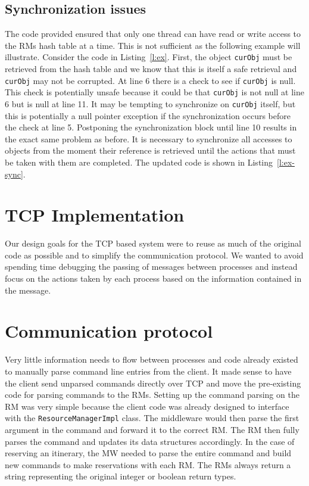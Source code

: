 \documentclass{article}
\newcommand{\includecode}[3]{}
\begin{document}
\subsection{Synchronization issues}

The code provided ensured that only one thread can have read or write access to the RMs hash table at a time. 
This is not sufficient as the following example will illustrate. 
Consider the code in Listing~\ref{l:ex}. 
First, the object \texttt{curObj} must be retrieved from the hash table and we know that this is itself a safe retrieval and \texttt{curObj} may not be corrupted. 
At line 6 there is a check to see if \texttt{curObj} is null. 
This check is potentially unsafe because it could be that \texttt{curObj} is not null at line 6 but is null at line 11. 
It may be tempting to synchronize on \texttt{curObj} itself, but this is potentially a null pointer exception if the synchronization occurs before the check at line 5. 
Postponing the synchronization block until line 10 results in the exact same problem as before. 
It is necessary to synchronize all accesses to objects from the moment their reference is retrieved until the actions that must be taken with them are completed. 
The updated code is shown in Listing~\ref{l:ex-sync}.

\includecode{example.java}{This code has several potential synchronization issues.}{l:ex}

\includecode{example-sync.java}{Almost the entire method body must be synchronized to prevent potential null pointer exceptions.}{l:ex-sync}

\section{TCP Implementation} 

Our design goals for the TCP based system were to reuse as much of the original code as possible and to simplify the communication protocol. 
We wanted to avoid spending time debugging the passing of messages between processes and instead focus on the actions taken by each process based on the information contained in the message. 

\section{Communication protocol}
Very little information needs to flow between processes and code already existed to manually parse command line entries from the client. 
It made sense to have the client send unparsed commands directly over TCP and move the pre-existing code for parsing commands to the RMs. 
Setting up the command parsing on the RM was very simple because the client code was already designed to interface with the \texttt{ResourceManagerImpl} class.  
The middleware would then parse the first argument in the command and forward it to the correct RM. 
The RM then fully parses the command and updates its data structures accordingly. 
In the case of reserving an itinerary, the MW needed to parse the entire command and build new commands to make reservations with each RM. 
The RMs always return a string representing the original integer or boolean return types. 
\end{document}
